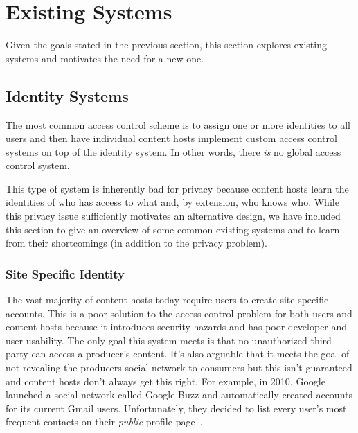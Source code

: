 \documentclass[pdftex,12pt,a4papaer,twoside,notitlepage]{report}
\begin{document}


\section{Existing Systems} 

Given the goals stated in the previous section, this section explores existing
systems and motivates the need for a new one.

\subsection{Identity Systems}

The most common access control scheme is to assign one or more identities to all
users and then have individual content hosts implement custom access control
systems on top of the identity system. In other words, there \emph{is} no global
access control system.

This type of system is inherently bad for privacy because content hosts learn
the identities of who has access to what and, by extension, who knows who. While
this privacy issue sufficiently motivates an alternative design, we have
included this section to give an overview of some common existing systems and to
learn from their shortcomings (in addition to the privacy problem).

\subsubsection{Site Specific Identity}

The vast majority of content hosts today require users to create site-specific
accounts. This is a poor solution to the access control problem for both users
and content hosts because it introduces security hazards and has poor developer
and user usability. The only goal this system meets is that no unauthorized
third party can access a producer's content. It's also arguable that it meets
the goal of not revealing the producers social network to consumers but this
isn't guaranteed and content hosts don't always get this right. For example, in
2010, Google launched a social network called Google Buzz and automatically
created accounts for its current Gmail users. Unfortunately, they decided to
list every user's most frequent contacts on their \emph{public} profile
page~\cite{google-buzz}.
\end{document}

